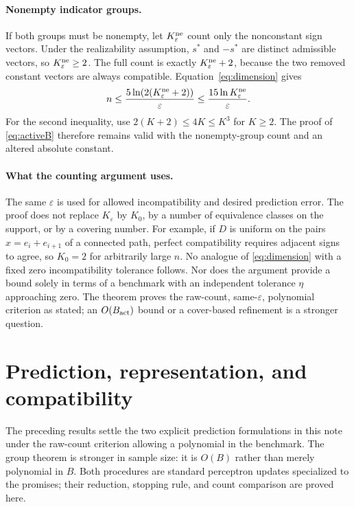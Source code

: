 \documentclass[11pt,a4paper]{article}
\theoremstyle{remark}
\newcommand{\1}{\mathbf 1}
\begin{document}
\paragraph{Nonempty indicator groups.}
If both groups must be nonempty, let $K_\varepsilon^{\rm ne}$ count only the
nonconstant sign vectors. Under the realizability assumption, $s^*$ and
$-s^*$ are distinct admissible vectors, so $K_\varepsilon^{\rm ne}\ge2$.
The full count is exactly $K_\varepsilon^{\rm ne}+2$, because the two removed
constant vectors are always compatible. Equation~\eqref{eq:dimension} gives
\[
 n\le
 \frac{5\ln(2(K_\varepsilon^{\rm ne}+2))}{\varepsilon}
 \le\frac{15\ln K_\varepsilon^{\rm ne}}{\varepsilon}.
\]
For the second inequality, use
$2(K+2)\le4K\le K^3$ for $K\ge2$.
The proof of \eqref{eq:activeB} therefore remains valid with the nonempty-group
count and an altered absolute constant.

\paragraph{What the counting argument uses.}
The same $\varepsilon$ is used for allowed incompatibility and desired
prediction error. The proof does not replace $K_\varepsilon$ by $K_0$, by
a number of equivalence classes on the support, or by a covering number.
For example, if $D$ is uniform on the pairs
$x=e_i+e_{i+1}$ of a connected path, perfect compatibility requires adjacent
signs to agree, so $K_0=2$ for arbitrarily large $n$. No analogue of
\eqref{eq:dimension} with a fixed zero incompatibility tolerance follows.
Nor does the argument provide a bound solely in terms of a benchmark with an
independent tolerance $\eta$ approaching zero. The theorem proves the
raw-count, same-$\varepsilon$, polynomial criterion as stated; an $O(B_{\rm act})$
bound or a cover-based refinement is a stronger question.

\section{Prediction, representation, and compatibility}

The preceding results settle the two explicit prediction formulations in this
note under the raw-count criterion allowing a polynomial in the benchmark.
The group theorem is stronger in sample size: it is $O(B)$ rather than merely
polynomial in $B$. Both procedures are standard perceptron updates specialized
to the promises; their reduction, stopping rule, and count comparison are
proved here.
\end{document}
